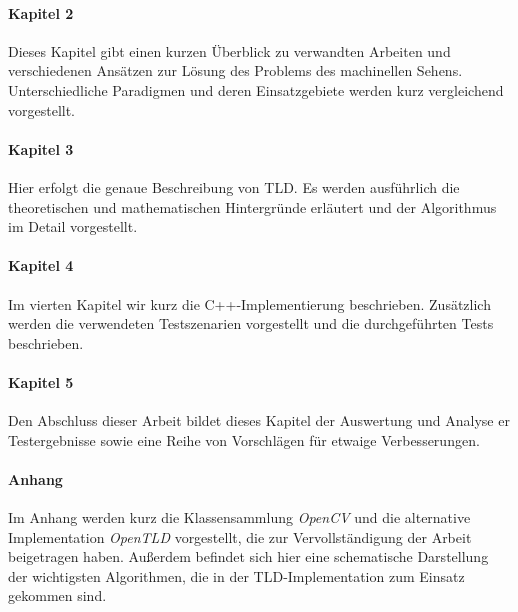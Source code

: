 \paragraph{Kapitel 2}
Dieses Kapitel gibt einen kurzen Überblick zu verwandten Arbeiten und verschiedenen Ansätzen zur Lösung des Problems des machinellen Sehens. Unterschiedliche Paradigmen und deren Einsatzgebiete werden kurz vergleichend vorgestellt.

\paragraph{Kapitel 3 }
Hier erfolgt die genaue Beschreibung von TLD. Es werden ausführlich die theoretischen und mathematischen Hintergründe erläutert und der Algorithmus im Detail vorgestellt.

\paragraph{Kapitel 4}
	Im vierten Kapitel wir kurz die C++-Implementierung beschrieben. Zusätzlich werden die verwendeten Testszenarien vorgestellt und die durchgeführten Tests beschrieben.

\paragraph{Kapitel 5}
	Den Abschluss dieser Arbeit bildet dieses Kapitel der Auswertung und Analyse er Testergebnisse sowie eine Reihe von Vorschlägen für etwaige Verbesserungen. 

\paragraph{Anhang}
	Im Anhang werden kurz die Klassensammlung { \em OpenCV} und die alternative Implementation { \em OpenTLD} vorgestellt, die zur Vervollständigung der Arbeit beigetragen haben. Außerdem befindet sich hier eine schematische Darstellung der wichtigsten Algorithmen, die in der TLD-Implementation zum Einsatz gekommen sind.